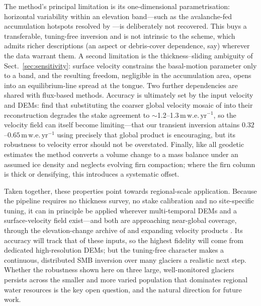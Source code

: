 The method's principal limitation is its one-dimensional parametrisation: horizontal
variability within an elevation band---such as the avalanche-fed accumulation
hotspots resolved by \citet{kneib2024}---is deliberately not recovered. This buys a
transferable, tuning-free inversion and is not intrinsic to the scheme, which admits
richer descriptions (an aspect or debris-cover dependence, say) wherever the data
warrant them. A second limitation is the thickness--sliding ambiguity of
Sect.~\ref{sec:sensitivity}: surface velocity constrains the basal-motion parameter
only to a band, and the resulting freedom, negligible in the accumulation area, opens
into an equilibrium-line spread at the tongue. Two further dependencies are shared
with flux-based methods. Accuracy is ultimately set by the input velocity and DEMs:
\citet{kneib2024} find that substituting the coarser global velocity mosaic of
\citet{millan2022} into their reconstruction degrades the stake agreement to
$\sim$1.2--1.3$\,\mathrm{m\,w.e.\,yr^{-1}}$, so the velocity field can itself become
limiting---that our transient inversion attains $0.32$--$0.65\,\mathrm{m\,w.e.\,yr^{-1}}$
using precisely that global product is encouraging, but its robustness to velocity
error should not be overstated. Finally, like all geodetic estimates the method
converts a volume change to a mass balance under an assumed ice density and neglects
evolving firn compaction; where the firn column is thick or densifying, this
introduces a systematic offset.

Taken together, these properties point towards regional-scale application. Because the
pipeline requires no thickness survey, no stake calibration and no site-specific
tuning, it can in principle be applied wherever multi-temporal DEMs and a
surface-velocity field exist---and both are approaching near-global coverage, through
the elevation-change archive of \citet{hugonnet2021} and expanding velocity products
\citep{millan2022}. Its accuracy will track that of these inputs, so the highest
fidelity will come from dedicated high-resolution DEMs; but the tuning-free character
makes a continuous, distributed SMB inversion over many glaciers a realistic next
step. Whether the robustness shown here on three large, well-monitored glaciers
persists across the smaller and more varied population that dominates regional water
resources is the key open question, and the natural direction for future work.
